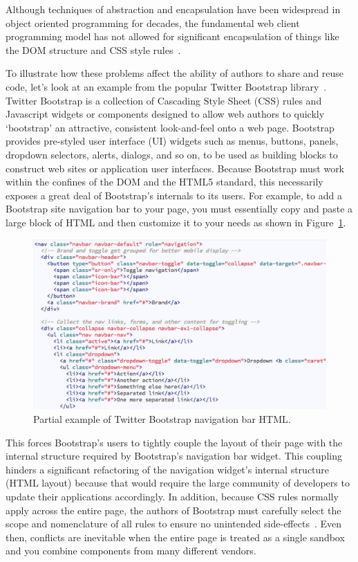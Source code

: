 Although techniques of abstraction and encapsulation have been widespread in object oriented programming for decades,
the fundamental web client programming model has not allowed for significant encapsulation of things like the DOM structure and CSS style rules~\cite{ihrig2012}.

To illustrate how these problems affect the ability of authors to share and reuse code, let's look at an example from the popular Twitter Bootstrap library~\cite{bootstrapcontributors2015}.
Twitter Bootstrap is a collection of Cascading Style Sheet (CSS) rules and Javascript widgets or components designed to allow web authors to quickly `bootstrap' an attractive, consistent look-and-feel onto a web page.
Bootstrap provides pre-styled user interface (UI) widgets such as menus, buttons, panels, dropdown selectors, alerts, dialogs, and so on, to be used as building blocks to construct web sites or application user interfaces.
Because Bootstrap must work within the confines of the DOM and the HTML5 standard, this necessarily exposes a great deal of Bootstrap's internals to its users.
For example, to add a Bootstrap site navigation bar to your page, you must essentially copy and paste a large block of HTML and then customize it to your needs as shown in Figure~\ref{f:twbs1}.

\begin{figure}[htb]
\centering
 \includegraphics[width=6in]{images/bootstrap_navbar_html.png}
\caption{Partial example of Twitter Bootstrap navigation bar HTML.}
\label{f:twbs1}
\end{figure}


This forces Bootstrap's users to tightly couple the layout of their page with the internal structure required by Bootstrap's navigation bar widget. 
This coupling hinders a significant refactoring of the navigation widget's internal structure (HTML layout) because that would require the large community of developers to update their applications accordingly.
In addition, because CSS rules normally apply across the entire page, the authors of Bootstrap must carefully select the scope and nomenclature of all rules to ensure no unintended side-effects~\cite{walton2014}. 
Even then, conflicts are inevitable when the entire page is treated as a single sandbox and you combine components from many different vendors. 

